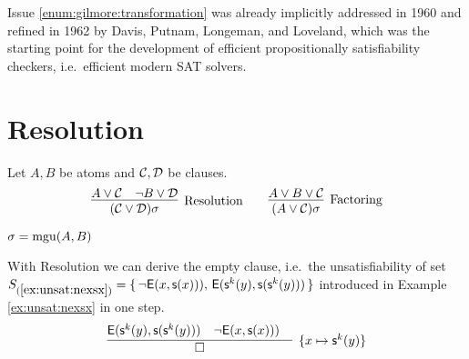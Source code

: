 Issue \ref{enum:gilmore:transformation} was already implicitly 
addressed in 1960 \cite{Davis:1960:CPQ:321033.321034}
and refined in 1962 \cite{Davis:1962:MPT:368273.368557}
by Davis, Putnam, Longeman, and Loveland, 
which was the starting point for the development of efficient propositionally satisfiability checkers, i.e.~efficient modern SAT solvers.

\section{Resolution}

\begin{definition}[Resolution] Let $A, B$ be atoms and ${\mathcal C},{\mathcal D}$ be clauses.
	\begin{gather*}
	\infer
	[\text{Resolution}] 
	{(\mcC\lor\mcD)\sigma}
	{A\lor\mcC&\lnot B\lor\mcD}
	\qquad
	\infer
	[\text{Factoring}] 
	{(A\lor\mcC)\sigma}
	{A\lor B\lor\mcC}
	\end{gather*}
	\begin{center}$\sigma=\operatorname{mgu}(A,B)$
	\end{center}
\end{definition}

\begin{example}
	With Resolution we can derive the empty clause, i.e.~the unsatisfiability of set
	$S_{(\ref{ex:unsat:nexsx})} =
	\{\,
	{ \lnot{\mathsf{E}}(x, {\mathsf s}(x)))},\, 
	{ {\mathsf{E}}({\mathsf s}^k(y), {\mathsf s}({\mathsf s}^k(y)))}
	\,\}$ 
	introduced in Example \ref{ex:unsat:nexsx} 
	in one step. 
	\begin{gather*}
	\infer[\{x\mapsto\msucc^k(y)\}]{
		\square
	}{
		{ \mE(\msucc^k(y), \msucc(\msucc^k(y)))} &
		{ \lnot\mE(x, \msucc(x)))} &
	}
	\end{gather*}
\end{example}


